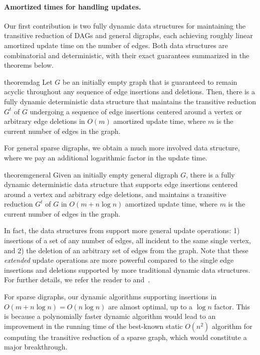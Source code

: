 \documentclass[11pt]{article}
\begin{document}
\paragraph*{Amortized times for handling updates.} Our first contribution is two fully dynamic data structures for maintaining the transitive reduction of DAGs and general digraphs, each achieving roughly linear amortized update time on the number of edges. Both data structures are combinatorial and deterministic, with their exact guarantees summarized in the theorems below. 
\begin{restatable}{theorem}{dag}\label{thm: OurResultsDag1}
    Let $G$ be an initially empty graph that is guaranteed to remain acyclic throughout any sequence of edge insertions and deletions.  Then, there is a fully dynamic deterministic data structure that maintains the transitive reduction $G^t$ of $G$ undergoing a sequence of edge insertions centered around a vertex or arbitrary edge deletions in $O(m)$ amortized update time, where $m$ is the current number of edges in the graph.
\end{restatable}

For general sparse digraphs, we obtain a much more involved data structure, where we  pay an additional logarithmic factor in the update time.


\begin{restatable}{theorem}{general}\label{thm: OurResultsDag2}
    Given an initially empty general digraph $G$, there is a fully dynamic deterministic data structure that supports edge insertions centered around a vertex and arbitrary edge deletions, and maintains a transitive reduction $G^t$ of $G$ in $O(m + n \log n)$ amortized update time, where $m$ is the current number of edges in the graph.
\end{restatable}


In fact, the data structures from  support more general update operations: 1) insertions of a set of any number of edges, all incident to the same single vertex, and 2) the deletion of an arbitrary set of edges from the graph. Note that these \emph{extended} update operations are more powerful compared to the single edge insertions and deletions supported by more traditional dynamic data structures. For further details, we refer the reader to  and~. 

For sparse digraphs, our dynamic algorithms supporting insertions in $O(m + n \log n) = O(n \log n)$ are almost optimal, up to a $\log n$ factor. This is because a polynomially faster dynamic algorithm would lead to an improvement in the running time of the best-known static $O(n^2)$ algorithm for computing the transitive reduction of a sparse graph, which would constitute a major breakthrough.
\end{document}
